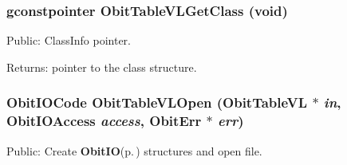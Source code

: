 \subsubsection{\setlength{\rightskip}{0pt plus 5cm}gconstpointer Obit\-Table\-VLGet\-Class (void)}\label{ObitTableVL_8h_a13}


Public: Class\-Info pointer. 

\begin{Desc}
\item[Returns:]pointer to the class structure. \end{Desc}
\subsubsection{\setlength{\rightskip}{0pt plus 5cm}Obit\-IOCode Obit\-Table\-VLOpen ({\bf Obit\-Table\-VL} $\ast$ {\em in}, Obit\-IOAccess {\em access}, {\bf Obit\-Err} $\ast$ {\em err})}\label{ObitTableVL_8h_a17}


Public: Create {\bf Obit\-IO}{\rm (p.\,\pageref{structObitIO})} structures and open file. 

